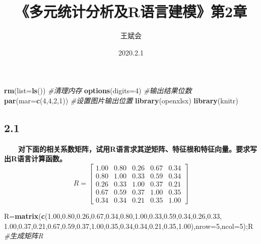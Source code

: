 \documentclass[
]{article}
\title{《多元统计分析及R语言建模》第2章}
\author{王斌会}
\date{2020.2.1}
\newenvironment{Shaded}{\begin{snugshade}}{\end{snugshade}}
\newcommand{\CommentTok}[1]{\textcolor[rgb]{0.56,0.35,0.01}{\textit{#1}}}
\newcommand{\DataTypeTok}[1]{\textcolor[rgb]{0.13,0.29,0.53}{#1}}
\newcommand{\DecValTok}[1]{\textcolor[rgb]{0.00,0.00,0.81}{#1}}
\newcommand{\FloatTok}[1]{\textcolor[rgb]{0.00,0.00,0.81}{#1}}
\newcommand{\KeywordTok}[1]{\textcolor[rgb]{0.13,0.29,0.53}{\textbf{#1}}}
\newcommand{\NormalTok}[1]{#1}
\begin{document}
\maketitle

\begin{Shaded}
\begin{Highlighting}[]
\KeywordTok{rm}\NormalTok{(}\DataTypeTok{list=}\KeywordTok{ls}\NormalTok{())                               }\CommentTok{#清理内存}
\KeywordTok{options}\NormalTok{(}\DataTypeTok{digits=}\DecValTok{4}\NormalTok{)                           }\CommentTok{#输出结果位数}
\KeywordTok{par}\NormalTok{(}\DataTypeTok{mar=}\KeywordTok{c}\NormalTok{(}\DecValTok{4}\NormalTok{,}\DecValTok{4}\NormalTok{,}\DecValTok{2}\NormalTok{,}\DecValTok{1}\NormalTok{))                         }\CommentTok{#设置图片输出位置}
\KeywordTok{library}\NormalTok{(openxlsx)}
\KeywordTok{library}\NormalTok{(knitr)}
\end{Highlighting}
\end{Shaded}

\hypertarget{section}{%
\subsection{2.1}\label{section}}

　　\textbf{对下面的相关系数矩阵，试用R语言求其逆矩阵、特征根和特征向量。要求写出R语言计算函数。}
\[R=\begin{bmatrix}
1.00&0.80&0.26&0.67&0.34\\
0.80&1.00&0.33&0.59&0.34\\
0.26&0.33&1.00&0.37&0.21\\
0.67&0.59&0.37&1.00&0.35\\
0.34&0.34&0.21&0.35&1.00
\end{bmatrix}\]

\begin{Shaded}
\begin{Highlighting}[]
\NormalTok{R=}\KeywordTok{matrix}\NormalTok{(}\KeywordTok{c}\NormalTok{(}\FloatTok{1.00}\NormalTok{,}\FloatTok{0.80}\NormalTok{,}\FloatTok{0.26}\NormalTok{,}\FloatTok{0.67}\NormalTok{,}\FloatTok{0.34}\NormalTok{,}\FloatTok{0.80}\NormalTok{,}\FloatTok{1.00}\NormalTok{,}\FloatTok{0.33}\NormalTok{,}\FloatTok{0.59}\NormalTok{,}\FloatTok{0.34}\NormalTok{,}\FloatTok{0.26}\NormalTok{,}\FloatTok{0.33}\NormalTok{,}
\FloatTok{1.00}\NormalTok{,}\FloatTok{0.37}\NormalTok{,}\FloatTok{0.21}\NormalTok{,}\FloatTok{0.67}\NormalTok{,}\FloatTok{0.59}\NormalTok{,}\FloatTok{0.37}\NormalTok{,}\FloatTok{1.00}\NormalTok{,}\FloatTok{0.35}\NormalTok{,}\FloatTok{0.34}\NormalTok{,}\FloatTok{0.34}\NormalTok{,}\FloatTok{0.21}\NormalTok{,}\FloatTok{0.35}\NormalTok{,}\FloatTok{1.00}\NormalTok{),}\DataTypeTok{nrow=}\DecValTok{5}\NormalTok{,}\DataTypeTok{ncol=}\DecValTok{5}\NormalTok{);R           }\CommentTok{#生成矩阵R}
\end{Highlighting}
\end{Shaded}
\end{document}
